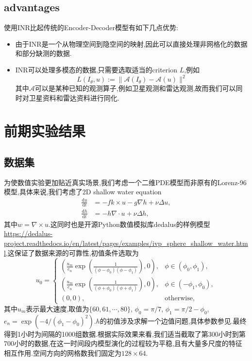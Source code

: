 \documentclass{article}
\newcommand{\md}{\mathrm{d}}
\newcommand{\mA}{\mathcal{A}}
\begin{document}
\subsection{advantages}
使用INR比起传统的Encoder-Decoder模型有如下几点优势:
\begin{itemize}
	\item 由于INR是一个从物理空间到隐空间的映射,因此可以直接处理非网格化的数据和部分缺测的数据.
	\item INR可以处理多模态的数据,只需要选取适当的criterion $L$,例如
	      \[L(I_\theta,u):=\|\mA(I_\theta)-\mA(u)\|^2\]
	      其中$\mA$可以是某种已知的观测算子,例如卫星观测和雷达观测,故而我们可以同时对卫星资料和雷达资料进行同化.
\end{itemize}
\section{前期实验结果}
\subsection{数据集}
为使数值实验更加贴近真实场景,我们考虑一个二维PDE模型而非原有的Lorenz-96模型,具体来说,我们考虑了2D shallow water equation
\begin{align*}
	\frac{\md u}{\md t} & =-fk\times u-g\nabla h+\nu\Delta u, \\
	\frac{\md h}{\md t} & =-h\nabla\cdot u+\nu\Delta h,
\end{align*}
其中$w=\nabla\times u$.这同时也是开源Python数值模拟库dedalus的样例模型 \url{https://dedalus-project.readthedocs.io/en/latest/pages/examples/ivp_sphere_shallow_water.html},这保证了数据来源的可靠性,初值条件选取为
\[
	u_0=\begin{cases}
		\left(\frac{u_m}{e_n}\exp\left(\frac1{(\phi-\phi_0)(\phi-\phi_1)}\right),0\right), & \phi\in(\phi_0,\phi_1),  \\
		\left(\frac{u_m}{e_n}\exp\left(\frac1{(\phi+\phi_0)(\phi+\phi_1)}\right),0\right), & \phi\in(-\phi_1,\phi_0), \\
		(0,0),                                                                             & \textrm{otherwise},
	\end{cases}
\]
其中$u_m$表示最大速度,取值为$\{60,61,\cdots,80\}$, $\phi_0=\pi/7$, $\phi_1=\pi/2-\phi_0$, $e_n=\exp(-4/(\phi_1-\phi_0)^2)$.$h$的初值涉及求解一个边值问题,具体参数参见\cite{Galewsky-2004}.最终得到1小时为间隔的1000组数据.根据实际效果来看,我们适当截取了第300小时到第700小时的数据,在这一时间段内模型演化的过程较为平稳,且有大量多尺度的特征相互作用.空间方向的网格数我们固定为$128\times64$.
\end{document}
